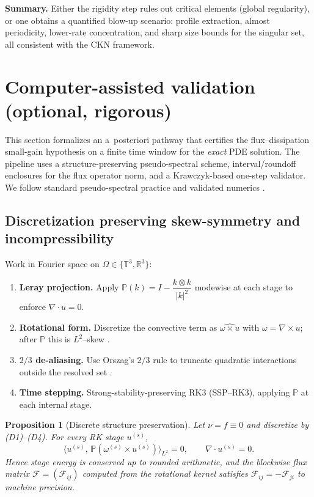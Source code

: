 \IfFileExists{nyjm.cls}{\documentclass[11pt]{nyjm}}{\documentclass[11pt]{amsart}}
\newcommand{\R}{\mathbb{R}}
\newcommand{\T}{\mathbb{T}}
\theoremstyle{plain}
\newtheorem{proposition}[theorem]{Proposition}
\theoremstyle{definition}
\theoremstyle{remark}
\begin{document}
\medskip
\noindent\textbf{Summary.}
Either the rigidity step rules out critical elements (global regularity), or one obtains a quantified blow-up scenario: profile extraction, almost periodicity, lower-rate concentration, and sharp size bounds for the singular set, all consistent with the CKN framework.

\section{Computer-assisted validation (optional, rigorous)}\label{sec:cav}

This section formalizes an a~posteriori pathway that certifies the flux–dissipation small-gain hypothesis on a finite time window for the \emph{exact} PDE solution. The pipeline uses a structure-preserving pseudo-spectral scheme, interval/roundoff enclosures for the flux operator norm, and a Krawczyk-based one-step validator. We follow standard pseudo-spectral practice \cite{Orszag1971,CanutoQuarteroniHussainiZang2006,Boyd2001} and validated numerics \cite{Neumaier1990,Rump1999,Tucker2011,Higham2002}.

\subsection{Discretization preserving skew-symmetry and incompressibility}\label{subsec:cav-discrete}
Work in Fourier space on $\Omega\in\{\T^3,\R^3\}$:
\begin{enumerate}[label=(D\arabic*)]
\item \textbf{Leray projection.} Apply $\mathbb P(k)=I-\dfrac{k\otimes k}{|k|^2}$ modewise at each stage to enforce $\nabla\!\cdot u=0$.
\item \textbf{Rotational form.} Discretize the convective term as $\widehat{\omega\times u}$ with $\omega=\nabla\times u$; after $\mathbb P$ this is $L^2$–skew \cite[Ch.~3]{CanutoQuarteroniHussainiZang2006}.
\item \textbf{$2/3$ de-aliasing.} Use Orszag’s $2/3$ rule to truncate quadratic interactions outside the resolved set \cite{Orszag1971}.
\item \textbf{Time stepping.} Strong-stability-preserving RK3 (SSP–RK3), applying $\mathbb P$ at each internal stage.
\end{enumerate}

\begin{proposition}[Discrete structure preservation]\label{prop:skew}
Let $\nu=f\equiv0$ and discretize by \textup{(D1)}–\textup{(D4)}. For every RK stage $u^{(s)}$,
\[
\langle u^{(s)},\, \mathbb P(\omega^{(s)}\times u^{(s)})\rangle_{L^2}=0,\qquad
\nabla\!\cdot u^{(s)}=0.
\]
Hence stage energy is conserved up to rounded arithmetic, and the blockwise flux matrix $\mathcal F=(\mathcal F_{ij})$ computed from the rotational kernel satisfies $\mathcal F_{ij}=-\mathcal F_{ji}$ to machine precision.
\end{proposition}
\end{document}
